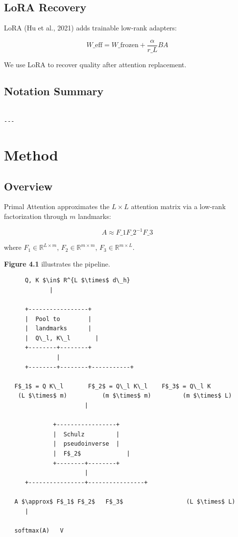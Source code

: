 \subsection{LoRA Recovery}

LoRA (Hu et al., 2021) adds trainable low-rank adapters:

\[
W\_\text{eff} = W\_\text{frozen} + \frac{\alpha}{r\_L} B A
\]

We use LoRA to recover quality after attention replacement.

\subsection{Notation Summary}

\begin{lstlisting}

---
\end{lstlisting}


\section{Method}

\subsection{Overview}

Primal Attention approximates the $L \times L$ attention matrix via a 
low-rank factorization through $m$ landmarks:

\[
A \approx F\_1 F\_2^{-1} F\_3
\]

where $F_1 \in \mathbb{R}^{L \times m}$, $F_2 \in \mathbb{R}^{m \times m}$, 
$F_3 \in \mathbb{R}^{m \times L}$.

\textbf{Figure 4.1} illustrates the pipeline.

\begin{lstlisting}
      Q, K $\in$ R^{L $\times$ d\_h}
             |
              
      +-----------------+
      |  Pool to        |
      |  landmarks      |
      |  Q\_l, K\_l       |
      +--------+--------+
               |
      +--------+--------+-----------+
                                     
   F$_1$ = Q K\_l       F$_2$ = Q\_l K\_l    F$_3$ = Q\_l K 
    (L $\times$ m)          (m $\times$ m)         (m $\times$ L)
                       |
                        
              +-----------------+
              |  Schulz         |
              |  pseudoinverse  |
              |  F$_2$             |
              +--------+--------+
                       |
      +----------------+----------------+
                                         
   A $\approx$ F$_1$ F$_2$   F$_3$                  (L $\times$ L)
      |
       
   softmax(A)   V
\end{lstlisting}

